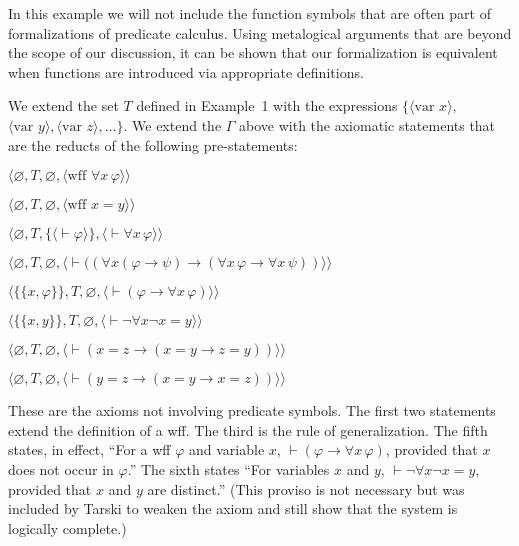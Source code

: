 In this example we will not include the function symbols that are often part of
formalizations of predicate calculus.  Using metalogical arguments that are
beyond the scope of our discussion, it can be shown that our formalization is
equivalent when functions are introduced via appropriate definitions.

We extend the set $T$ defined in Example~1 with the expressions
$\{\langle \mbox{var\ } x\rangle,$ $ \langle \mbox{var\ } y\rangle, \langle
\mbox{var\ } z\rangle,\ldots\}$.  We extend the $\Gamma$ above
with the axiomatic statements that are the reducts of the following
pre-statements:
\begin{list}{}{\itemsep 0.0pt}
      \item[] $\langle\varnothing,T,\varnothing,
               \langle \mbox{wff\ }\forall x\,\varphi\rangle\rangle$
      \item[] $\langle\varnothing,T,\varnothing,
               \langle \mbox{wff\ }x=y\rangle\rangle$
      \item[] $\langle\varnothing,T,
               \{\langle\vdash\varphi\rangle\},
               \langle\vdash\forall x\,\varphi\rangle\rangle$
      \item[] $\langle\varnothing,T,\varnothing,
               \langle \vdash((\forall x(\varphi\to\psi)
                  \to(\forall x\,\varphi\to\forall x\,\psi))
               \rangle\rangle$
      \item[] $\langle\{\{x,\varphi\}\},T,\varnothing,
               \langle \vdash(\varphi\to\forall x\,\varphi)
               \rangle\rangle$
      \item[] $\langle\{\{x,y\}\},T,\varnothing,
               \langle \vdash\lnot\forall x\lnot x=y
               \rangle\rangle$
      \item[] $\langle\varnothing,T,\varnothing,
               \langle \vdash(x=z
                  \to(x=y\to z=y))
               \rangle\rangle$
      \item[] $\langle\varnothing,T,\varnothing,
               \langle \vdash(y=z
                  \to(x=y\to x=z))
               \rangle\rangle$
\end{list}
These are the axioms not involving predicate symbols. The first two statements
extend the definition of a wff.  The third is the rule of generalization.  The
fifth states, in effect, ``For a wff $\varphi$ and variable $x$,
$\vdash(\varphi\to\forall x\,\varphi)$, provided that $x$ does not occur in
$\varphi$.''  The sixth states ``For variables $x$ and $y$,
$\vdash\lnot\forall x\lnot x = y$, provided that $x$ and $y$ are distinct.''
(This proviso is not necessary but was included by Tarski to
weaken the axiom and still show that the system is logically complete.)

